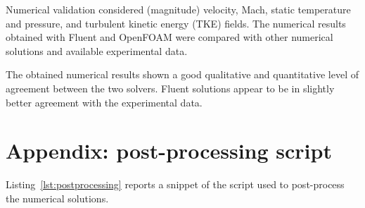 \documentclass[12pt]{article}
\begin{document}
Numerical validation considered (magnitude) velocity, Mach, static temperature and pressure, and turbulent kinetic energy (TKE) fields. The numerical results obtained with Fluent and OpenFOAM were compared with other numerical solutions and available experimental data.

The obtained numerical results shown a good qualitative and quantitative level of agreement between the two solvers. Fluent solutions appear to be in slightly better agreement with the experimental data.

%

\section{Appendix: post-processing script}\label{sec:post}
Listing~\ref{lst:postprocessing} reports a snippet of the script used to post-process the numerical solutions.
\end{document}
